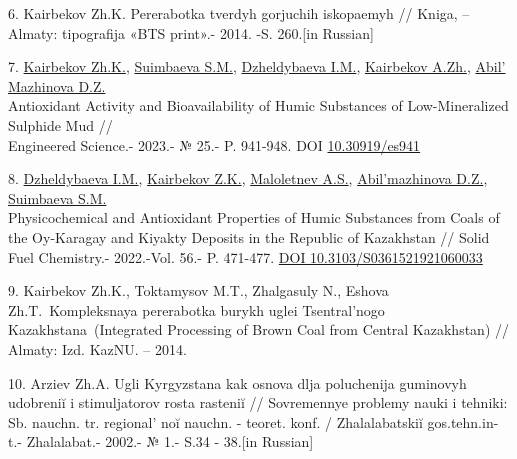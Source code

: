\begin{references}
6. Kairbekov Zh.K. Pererabotka tverdyh gorjuchih iskopaemyh // Kniga, --
Almaty: tipografija «BTS print».- 2014. -S. 260.{[}in Russian{]}

7.
\href{https://www.scopus.com/authid/detail.uri?authorId=55910705200}{Kairbekov
Zh.K.},
\href{https://www.scopus.com/authid/detail.uri?authorId=57201691853}{Suimbaeva
S.M.},
\href{https://www.scopus.com/authid/detail.uri?authorId=56600659100}{Dzheldybaeva
I.M.},
\href{https://www.scopus.com/authid/detail.uri?authorId=56600640700}{Kairbekov
A.Zh.},
\href{https://www.scopus.com/authid/detail.uri?authorId=58021595400}{Abil' Mazhinova
D.Z.} \\Antioxidant Activity and Bioavailability of Humic Substances of
Low-Mineralized Sulphide Mud // \\Engineered Science.- 2023.- № 25.- P.
941-948. DOI \href{http://dx.doi.org/10.30919/es941}{10.30919/es941}

8.
\href{https://www.scopus.com/authid/detail.uri?authorId=56600659100}{Dzheldybaeva
I.M.},
\href{https://www.scopus.com/authid/detail.uri?authorId=55910705200}{Kairbekov
Z.K.},
\href{https://www.scopus.com/authid/detail.uri?authorId=7003481604}{Maloletnev
A.S.},
\href{https://www.scopus.com/authid/detail.uri?authorId=58021595400}{Abil'mazhinova
D.Z.},
\href{https://www.scopus.com/authid/detail.uri?authorId=57201691853}{Suimbaeva
S.M.} \\Physicochemical and Antioxidant Properties of Humic Substances
from Coals of the Oy-Karagay and Kiyakty Deposits in the Republic of
Kazakhstan // Solid Fuel Chemistry.- 2022.-Vol. 56.- P. 471-477.
\href{https://doi.org/10.3103/S0361521921060033}{DOI
10.3103/S0361521921060033}

9. Kairbekov Zh.K., Toktamysov M.T., Zhalgasuly N., Eshova
Zh.T.~Kompleksnaya pererabotka burykh uglei Tsentral'nogo
Kazakhstana~(Integrated Processing of Brown Coal from Central
Kazakhstan) // Almaty: Izd. KazNU. -- 2014.

10. Arziev Zh.A. Ugli Kyrgyzstana kak osnova dlja poluchenija guminovyh
udobreniĭ i stimuljatorov rosta rasteniĭ // Sovremennye problemy nauki i
tehniki: Sb. nauchn. tr. regional' noĭ nauchn. - teoret.
konf. / Zhalalabatskiĭ gos.tehn.in-t.- Zhalalabat.- 2002.- № 1.- S.34 -
38.{[}in Russian{]}
\end{references}

